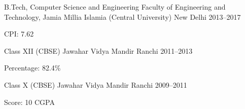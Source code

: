 
\begin{cventries}

\cventry%
  {B.Tech, Computer Science and Engineering} %
  {Faculty of Engineering and Technology, Jamia Millia Islamia (Central
   University)} %
  {New Delhi} %
  {2013--2017} %
  {%
    \begin{cvitems}%
      \item{CPI: 7.62}
    \end{cvitems}
  }

\cventry%
  {Class XII (CBSE)} %
  {Jawahar Vidya Mandir} %
  {Ranchi} %
  {2011--2013} %
  {%
    \begin{cvitems} %
      \item{Percentage: 82.4\%}
    \end{cvitems}
  }

\cventry%
  {Class X (CBSE)} %
  {Jawahar Vidya Mandir} %
  {Ranchi} %
  {2009--2011} %
  {%
    \begin{cvitems} %
      \item{Score: 10 CGPA}
    \end{cvitems}
  }

\end{cventries}
